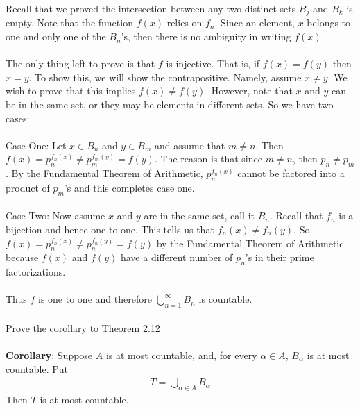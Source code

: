 \documentclass[12pt]{article}
\begin{document}
Recall that we proved the intersection between any two distinct sets $B_{j}$ and $B_{k}$ is empty. Note that the function $f(x)$ relies on $f_{n}$. Since an element, $x$ belongs to one and only one of the $B_{n}$'s, then there is no ambiguity in writing $f(x)$. \\ \\

The only thing left to prove is that $f$ is injective. That is, if $f(x)=f(y)$ then $x=y$.  To show this, we will show the contrapositive. Namely, assume $x \neq y$. We wish to prove that this implies $f(x) \neq f(y)$. However, note that $x$ and $y$ can be in the same set, or they may be elements in different sets. So we have two cases: \\ \\

Case One: Let $x \in B_{n}$ and $y \in B_{m}$ and assume that $m \neq n$. Then $f(x)=p_{n}^{f_{n}(x)} \neq p_{m}^{f_{m}(y)} = f(y)$. The reason is that since $m \neq n$, then $p_{n} \neq p_{m}$. By the Fundamental Theorem of Arithmetic, $p_{n}^{f_{n}(x)}$ cannot be factored into a product of $p_{m}$'s and this completes case one. \\ \\ 

Case Two: Now assume $x$ and $y$ are in the same set, call it $B_{n}$. Recall that $f_{n}$ is a bijection and hence one to one. This tells us that $f_{n}(x) \neq f_{n}(y)$. So $f(x)=p_{n}^{f_{n}(x)} \neq p_{n}^{f_{n}(y)} = f(y)$ by the Fundamental Theorem of Arithmetic because $f(x)$ and $f(y)$ have a different number of $p_{n}$'s in their prime factorizations. \\ \\

Thus $f$ is one to one and therefore $\bigcup^{\infty}_{n=1} B_{n}$ is countable.  \\ \\

\problem
Prove the corollary to Theorem 2.12 \\ \\

\noindent \textbf{Corollary}: Suppose $A$ is at most countable, and, for every $\alpha \in A$, $B_{\alpha}$ is at most countable. Put 
\begin{align*}
T= \bigcup_{\alpha \in A}B_{\alpha}
\end{align*}
Then $T$ is at most countable. \\ \\
\end{document}
